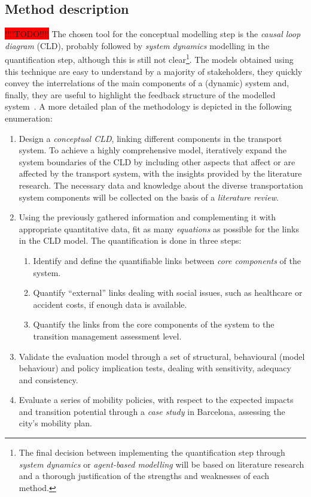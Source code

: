 \documentclass[a4paper,fontsize=10pt,bibliography=totoc]{scrartcl}
\begin{document}
\begin{multicols}{2}
\section{Method description}
\colorbox{red}{!!!!TODO!!!!}
The chosen tool for the conceptual modelling step is the \textit{causal loop diagram} (CLD), probably followed by \textit{system dynamics} modelling in the quantification step, although this is still not clear\footnote{The final decision between implementing the quantification step through \textit{system dynamics} or \textit{agent-based modelling} will be based on literature research and a thorough justification of the strengths and weaknesses of each method.}. The models obtained using this technique are easy to understand by a majority of stakeholders, they quickly convey the interrelations of the main components of a (dynamic) system and, finally, they are useful to highlight the feedback structure of the modelled system~\parencite{ghosh2015_DynamicSystemsEveryone}. A more detailed plan of the methodology is depicted in the following enumeration:
%
\begin{enumerate}[label=(\alph*)]
	\item Design a \textit{conceptual CLD}, linking different components in the transport system. To achieve a highly comprehensive model, iteratively expand the system boundaries of the CLD by including other aspects that affect or are affected by the transport system, with the insights provided by the literature research. The necessary data and knowledge about the diverse transportation system components will be collected on the basis of a \textit{literature review}.
	\item Using the previously gathered information and complementing it with appropriate quantitative data, fit as many \textit{equations} as possible for the links in the CLD model. The quantification is done in three steps:
	\begin{enumerate}[label=\roman*.]
		\item Identify and define the quantifiable links between \textit{core components} of the system.
		\item Quantify ``external'' links dealing with social issues, such as healthcare or accident costs, if enough data is available.
		\item Quantify the links from the core components of the system to the transition management assessment level.
	\end{enumerate}
	\item Validate the evaluation model through a set of structural, behavioural (model behaviour) and policy implication tests, dealing with sensitivity, adequacy and consistency.
	\item Evaluate a series of mobility policies, with respect to the expected impacts and transition potential through a \textit{case study} in Barcelona, assessing the city's mobility plan.
\end{enumerate}


\end{multicols}
\end{document}
